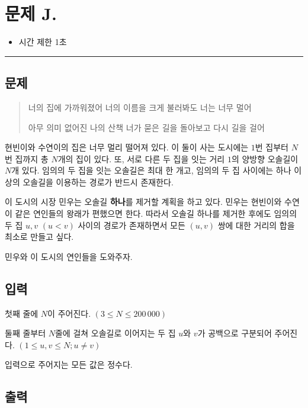 \newpage
\section*{{\Large 문제 J.} }

\begin{itemize}
    \item 시간 제한 \tabto{2cm} 1초
\end{itemize}

\hrule

\subsection*{문제}

\begin{quote}
너의 집에 가까워졌어 너의 이름을 크게 불러봐도 너는 너무 멀어 

아무 의미 없어진 나의 산책 너가 묻은 길을 돌아보고 다시 길을 걸어
\end{quote}

현빈이와 수연이의 집은 너무 멀리 떨어져 있다. 이 둘이 사는 도시에는 $1$번 집부터 $N$번 집까지 총 $N$개의 집이 있다. 또, 서로 다른 두 집을 잇는 거리 $1$의 양방향 오솔길이 $N$개 있다. 임의의 두 집을 잇는 오솔길은 최대 한 개고, 임의의 두 집 사이에는 하나 이상의 오솔길을 이용하는 경로가 반드시 존재한다.

이 도시의 시장 민우는 오솔길 \textbf{하나}를 제거할 계획을 하고 있다. 민우는 현빈이와 수연이 같은 연인들의 왕래가 편했으면 한다. 따라서 오솔길 하나를 제거한 후에도 임의의 두 집 $u,v$ $(u<v)$ 사이의 경로가 존재하면서 모든 $(u,v)$ 쌍에 대한 거리의 합을 최소로 만들고 싶다.

민우와 이 도시의 연인들을 도와주자.

\subsection*{입력}

첫째 줄에 $N$이 주어진다. $(3\leq N \leq 200\,000)$

둘째 줄부터 $N$줄에 걸쳐 오솔길로 이어지는 두 집 $u$와 $v$가 공백으로 구분되어 주어진다. $(1\leq u,v \leq N; u\neq v)$ 

입력으로 주어지는 모든 값은 정수다.

\subsection*{출력}


